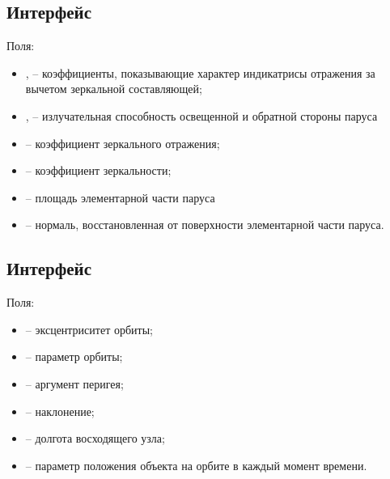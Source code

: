 \subsection{Интерфейс }
\noindent\indent Поля:
\begin{itemize}
    \item {},  -- коэффициенты, показывающие характер индикатрисы отражения
    за вычетом зеркальной составляющей;
    \item {},  -- излучательная способность освещенной и обратной стороны паруса
    \item {} -- коэффициент зеркального отражения;
    \item {} -- коэффициент зеркальности;
    \item {} -- площадь элементарной части паруса
    \item {} -- нормаль, восстановленная от поверхности элементарной части паруса.
\end{itemize}
\subsection{Интерфейс }
\noindent\indent Поля:
\begin{itemize}
    \item {} -- эксцентриситет орбиты;
    \item {} -- параметр орбиты;
    \item {} -- аргумент перигея;
    \item {} -- наклонение;
    \item {} -- долгота восходящего узла;
    \item {} -- параметр положения объекта на орбите в каждый момент времени.
\end{itemize}
